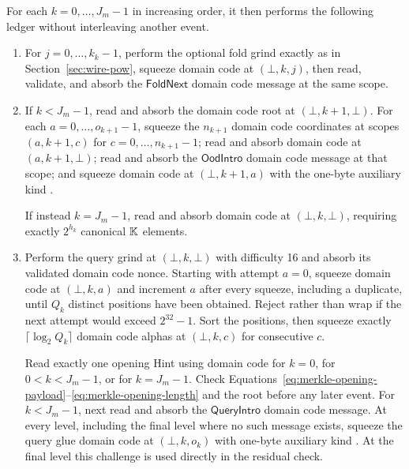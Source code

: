 For each $k=0,\ldots,J_m-1$ in increasing order, it then performs the
following ledger without interleaving another event.
\begin{enumerate}
 \item For $j=0,\ldots,k_k-1$, perform the optional fold grind exactly as in
 Section~\ref{sec:wire-pow}, squeeze domain code  at
 $(\bot,k,j)$, then read, validate, and absorb the $\mathsf{FoldNext}$
 domain code  message at the same scope.

 \item If $k<J_m-1$, read and absorb the domain code  root at
 $(\bot,k+1,\bot)$.  For each $a=0,\ldots,o_{k+1}-1$, squeeze the
 $n_{k+1}$ domain code  coordinates at scopes $(a,k+1,c)$ for
 $c=0,\ldots,n_{k+1}-1$; read and absorb domain code  at
 $(a,k+1,\bot)$; read and absorb the $\mathsf{OodIntro}$ domain code 
 message at that scope; and squeeze domain code  at
 $(\bot,k+1,a)$ with the one-byte auxiliary kind .

 If instead $k=J_m-1$, read and absorb domain code  at
 $(\bot,k,\bot)$, requiring exactly $2^{h_k}$ canonical $\mathbb K$ elements.

 \item Perform the query grind at $(\bot,k,\bot)$ with difficulty 16 and
 absorb its validated domain code  nonce.  Starting with attempt $a=0$,
 squeeze domain code  at $(\bot,k,a)$ and increment $a$ after every
 squeeze, including a duplicate, until $Q_k$ distinct positions have been
 obtained.  Reject rather than wrap if the next attempt would exceed
 $2^{32}-1$.  Sort the positions, then squeeze exactly
 $\lceil\log_2Q_k\rceil$ domain code  alphas at $(\bot,k,c)$ for
 consecutive $c$.

 Read exactly one opening Hint using domain code  for $k=0$,
  for $0<k<J_m-1$, or  for $k=J_m-1$.  Check
 Equations~\eqref{eq:merkle-opening-payload}--\eqref{eq:merkle-opening-length}
 and the root before any later event.  For $k<J_m-1$, next read and absorb
 the $\mathsf{QueryIntro}$ domain code  message.  At every level,
 including the final level where no such message exists, squeeze the query
 glue domain code  at $(\bot,k,o_k)$ with one-byte auxiliary kind
 .  At the final level this challenge is used directly in the
 residual check.
\end{enumerate}

